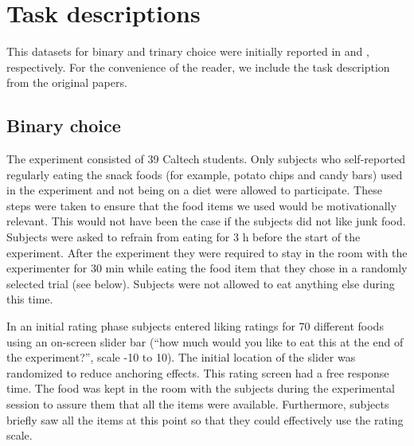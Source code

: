 





\section{Task descriptions}\label{app:attention-task}

This datasets for binary and trinary choice were initially reported in \citet{krajbich2010visual} and \citet{krajbich2011multialternative}, respectively. For the convenience of the reader, we include the task description from the original papers.

\subsection{Binary choice}\label{sec:binary-choice}

The experiment consisted of 39 Caltech students. Only subjects who self-reported regularly eating the snack foods (for example, potato chips and candy bars) used in the experiment and not being on a diet were allowed to participate. These steps were taken to ensure that the food items we used would be motivationally relevant. This would not have been the case if the subjects did not like junk food. Subjects were asked to refrain from eating for 3 h before the start of the experiment. After the experiment they were required to stay in the room with the experimenter for 30 min while eating the food item that they chose in a randomly selected trial (see below). Subjects were not allowed to eat anything else during this time.

In an initial rating phase subjects entered liking ratings for 70 different foods using an on-screen slider bar (“how much would you like to eat this at the end of the experiment?”, scale -10 to 10). The initial location of the slider was randomized to reduce anchoring effects. This rating screen had a free response time. The food was kept in the room with the subjects during the experimental session to assure them that all the items were available. Furthermore, subjects briefly saw all the items at this point so that they could effectively use the rating scale.

